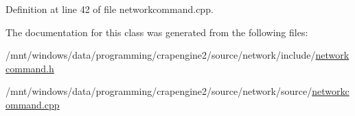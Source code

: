 Definition at line 42 of file networkcommand.\+cpp.



The documentation for this class was generated from the following files\+:\begin{DoxyCompactItemize}
\item 
/mnt/windows/data/programming/crapengine2/source/network/include/\hyperlink{networkcommand_8h}{networkcommand.\+h}\item 
/mnt/windows/data/programming/crapengine2/source/network/source/\hyperlink{networkcommand_8cpp}{networkcommand.\+cpp}\end{DoxyCompactItemize}
